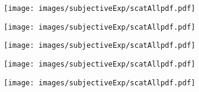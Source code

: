 \documentclass[11pt,a4j,dvipdfmx]{jreport}
\begin{document}
\clearpage


\begin{figure}[H]
  \centering
  \texttt{[image: images/subjectiveExp/scatAllpdf.pdf]}
\end{figure}

\begin{figure}[H]
  \begin{minipage}[b]{0.5\linewidth}
    \centering
    \texttt{[image: images/subjectiveExp/scatAllpdf.pdf]}
  \end{minipage}%
  \begin{minipage}[b]{0.5\linewidth}
    \centering
    \texttt{[image: images/subjectiveExp/scatAllpdf.pdf]}
  \end{minipage}

  \begin{minipage}[b]{0.5\linewidth}
    \centering
    \texttt{[image: images/subjectiveExp/scatAllpdf.pdf]}
  \end{minipage}%
  \begin{minipage}[b]{0.5\linewidth}
    \centering
    \texttt{[image: images/subjectiveExp/scatAllpdf.pdf]}
  \end{minipage}
\end{figure}

\clearpage


\end{document}
